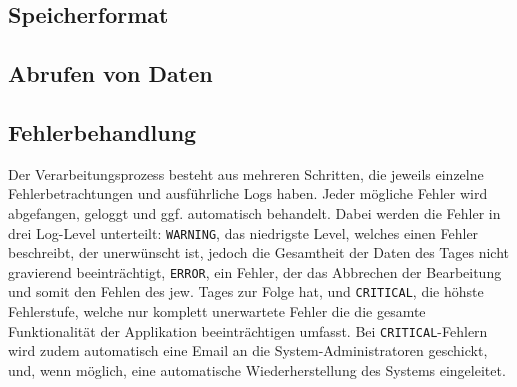 \subsection{Speicherformat}

\subsection{Abrufen von Daten}

\subsection{Fehlerbehandlung}
Der Verarbeitungsprozess besteht aus mehreren Schritten, die jeweils einzelne Fehlerbetrachtungen
und ausführliche Logs haben. Jeder mögliche Fehler wird abgefangen, geloggt und ggf. automatisch 
behandelt. Dabei werden die Fehler in drei Log-Level unterteilt: \texttt{WARNING}, das niedrigste Level,
welches einen Fehler beschreibt, der unerwünscht ist, jedoch die Gesamtheit der Daten des Tages
nicht gravierend beeinträchtigt, \texttt{ERROR}, ein Fehler, der das Abbrechen der Bearbeitung und somit
den Fehlen des jew. Tages zur Folge hat, und \texttt{CRITICAL}, die höhste Fehlerstufe, welche nur komplett
unerwartete Fehler die die gesamte Funktionalität der Applikation beeinträchtigen umfasst.
Bei \texttt{CRITICAL}-Fehlern wird zudem automatisch eine Email an die System-Administratoren geschickt,
und, wenn möglich, eine automatische Wiederherstellung des Systems eingeleitet.